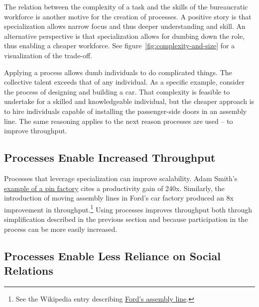 The relation between the complexity of a task and the skills of the bureaucratic workforce is another motive for the creation of processes.
A positive story is that specialization allows narrow focus and thus deeper understanding and skill. An alternative perspective is that specialization allows for dumbing down the role, thus enabling a cheaper workforce. See figure~\ref{fig:complexity-and-size}%
\iftoggle{haspagenumbers}{on page~\pageref{fig:complexity-and-size}}{}
for a visualization of the trade-off.

Applying a process allows dumb individuals to do complicated things. The collective talent exceeds that of any individual.  As a specific example, consider the process of designing and building a car. That complexity is feasible to undertake for a skilled and knowledgeable individual, but the cheaper approach is to hire individuals capable of installing the passenger-side doors in an assembly line. The same reasoning applies to the next reason processes are used -- to improve throughput.



\subsection*{Processes Enable Increased Throughput}

Processes that leverage specialization can improve scalability. Adam Smith's \href{https://en.wikipedia.org/wiki/Business_process\%23Adam_Smith}{example of a pin factory} cites a productivity gain of 240x.
Similarly, the introduction of moving assembly lines in Ford's car factory produced an 8x improvement in throughput.\footnote{See the Wikipedia entry describing \href{https://en.wikipedia.org/wiki/Assembly_line\%2320th_century}{Ford's assembly line}.
} Using processes improves throughput both through simplification described in the previous section and because participation in the process can be more easily increased.


\subsection*{Processes Enable Less Reliance on Social Relations}

